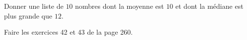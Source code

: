 
\begin{exercice}\label{exosmath-0538}

    Donner une liste de \( 10\) nombres dont la moyenne est \( 10\) et dont la médiane est plus grande que \( 12\).

    Faire les exercices 42 et 43 de la page 260.

\end{exercice}
